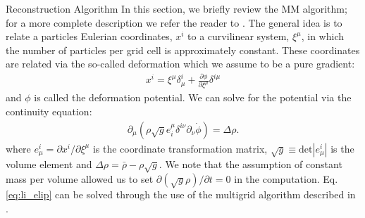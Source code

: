 \begin{section}{Reconstruction Algorithm}
  \label{sec:reconstruction}
  In this section, we briefly review the MM algorithm; for a more
  complete description we refer the reader to \cite{bib:Zhu2016}.  The
  general idea is to relate a particles Eulerian coordinates, $x^i$ to
  a curvilinear system, $\xi^\mu$, in which the number of particles
  per grid cell is approximately constant.  These coordinates are
  related via the so-called deformation which we assume to be a pure
  gradient:
  \begin{align}
    x^i = \xi^\mu \delta^i_\mu + \frac{\partial \phi}{\partial
    \xi^\mu}\delta^{i\mu}
  \end{align}
  and $\phi$ is called the deformation potential.  We can solve for
  the potential via the continuity equation:
  \begin{align}
    \label{eq:li_elip}
    \partial _\mu (\rho \sqrt{g} e^\mu _i \delta^{i\nu}
    \partial_\nu \dot{\phi})=\Delta \rho.
  \end{align}
  where $e^i_\mu = \partial x^i / \partial \xi ^ \mu$ is the
  coordinate transformation matrix,
  $\sqrt{g} \equiv \mathrm{det}\left| e^i_\mu\right|$ is the volume
  element and $\Delta \rho = \bar{\rho}-\rho \sqrt{g}$.  We note that
  the assumption of constant mass per volume allowed us to set
  $\partial(\sqrt{g}\rho)/\partial t = 0$ in the computation.
  Eq. \ref{eq:li_elip} can be solved through the use of the multigrid
  algorithm described in \cite{bib:Pen1995,bib:Pen1998,bib:ZhuH2016}.

\end{section}


